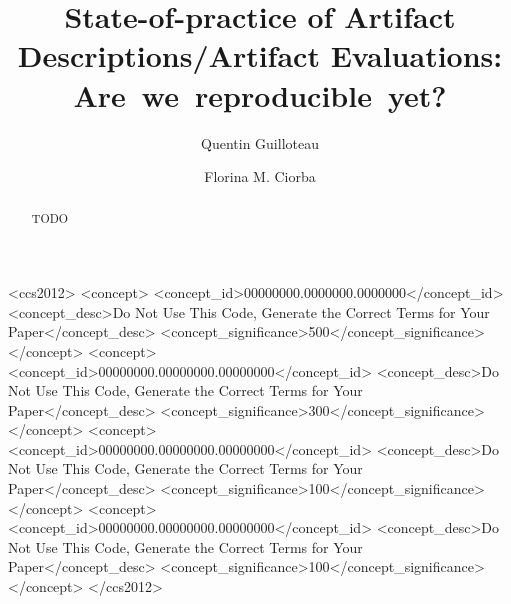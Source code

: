 \documentclass[sigconf,natbib=false]{acmart}
\newcommand{\ad}{Artifact Description}
\newcommand{\aeval}{Artifact Evaluation}
\begin{document}
\title{State-of-practice of \ad s/\aeval s: Are~we~reproducible~yet?}

\author{Quentin Guilloteau}\author{Florina M. Ciorba}


\begin{abstract}
TODO
\end{abstract}

\begin{CCSXML}
<ccs2012>
 <concept>
  <concept_id>00000000.0000000.0000000</concept_id>
  <concept_desc>Do Not Use This Code, Generate the Correct Terms for Your Paper</concept_desc>
  <concept_significance>500</concept_significance>
 </concept>
 <concept>
  <concept_id>00000000.00000000.00000000</concept_id>
  <concept_desc>Do Not Use This Code, Generate the Correct Terms for Your Paper</concept_desc>
  <concept_significance>300</concept_significance>
 </concept>
 <concept>
  <concept_id>00000000.00000000.00000000</concept_id>
  <concept_desc>Do Not Use This Code, Generate the Correct Terms for Your Paper</concept_desc>
  <concept_significance>100</concept_significance>
 </concept>
 <concept>
  <concept_id>00000000.00000000.00000000</concept_id>
  <concept_desc>Do Not Use This Code, Generate the Correct Terms for Your Paper</concept_desc>
  <concept_significance>100</concept_significance>
 </concept>
</ccs2012>
\end{CCSXML}



\end{document}

